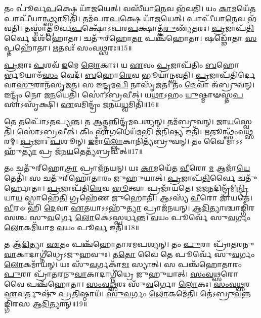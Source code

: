 𑌤𑌂 𑌪𑍂॑𑌰𑍍𑌵\-\ul{𑌪}\-𑌕𑍍𑌷𑍇 𑌯𑌾᳴𑌜𑌯𑍇𑌤𑍍।
𑌵𑌸𑍀᳴𑌯𑌾\-\ul{𑌨𑍇}\-𑌵 𑌭᳴𑌵𑌤𑌿।
𑌯𑌂 \ul{𑌕𑌾}\-𑌮𑌯𑍇᳴\-\ul{𑌤} 𑌪𑌾𑌪𑍀᳴𑌯𑌾\-\ul{𑌨𑍍𑌥𑍍𑌸𑍍𑌯𑌾}\-𑌦𑌿𑌤𑌿᳴।
𑌤𑌮᳴𑌪𑌰\-\ul{𑌪}\-𑌕𑍍𑌷𑍇 𑌯𑌾᳴𑌜𑌯𑍇𑌤𑍍।
𑌪𑌾𑌪𑍀᳴𑌯𑌾\-\ul{𑌨𑍇}\-𑌵 𑌭᳴𑌵𑌤𑌿।
𑌤𑌸𑍍𑌮𑌾॑𑌤𑍍𑌪𑍂𑌰𑍍𑌵\-\ul{𑌪}\-𑌕𑍍𑌷𑍋᳴\-𑌽𑌪𑌰\-\ul{𑌪}\-𑌕𑍍𑌷𑌾𑌤𑍍𑌕᳴\-\ul{𑌰𑍁}\-𑌣𑍍𑌯᳴𑌤𑌰𑌃।
\-\ul{𑌪𑍍𑌰}\-𑌜𑌾𑌪᳴\-\ul{𑌤𑌿}\-𑌰𑍍𑌵𑍈 𑌦𑌶᳴𑌹𑍋𑌤𑌾।
𑌚𑌤𑍁᳴𑌰𑍍‌\mbox{}𑌹𑍋\-\ul{𑌤𑌾} 𑌪𑌞𑍍𑌚᳴𑌹𑍋𑌤𑌾।
𑌷𑌡𑍍𑌢𑍋᳴𑌤𑌾 \ul{𑌸}\-𑌪𑍍𑌤𑌹𑍋᳴𑌤𑌾।
\-\ul{𑌋}\-𑌤𑌵𑌃᳴ 𑌸𑌂𑌵\-\ul{𑌥𑍍𑌸}\-𑌰𑌃॥15॥

\-\ul{𑌪𑍍𑌰}\-𑌜𑌾𑌃 \ul{𑌪}\-𑌶𑌵᳴ \ul{𑌇}\-𑌮𑍇 \ul{𑌲𑍋}\-𑌕𑌾𑌃।
𑌯 \ul{𑌏}\-𑌵𑌂 \ul{𑌪𑍍𑌰}\-𑌜𑌾𑌪᳴𑌤𑌿𑌂 \ul{𑌬}\-𑌹𑍋𑌰𑍍𑌭𑍂𑌯𑌾𑍞᳴\-\ul{𑌸𑌂} 𑌵𑍇𑌦᳴।
\-\ul{𑌬}\-𑌹𑍋\-\ul{𑌰𑍇}\-𑌵 𑌭𑍂𑌯𑌾॑𑌨𑍍𑌭𑌵𑌤𑌿।
\-\ul{𑌪𑍍𑌰}\-𑌜𑌾𑌪᳴𑌤𑌿𑌰𑍍𑌦𑍇𑌵𑌾\-\ul{𑌸𑍁}\-𑌰𑌾𑌨᳴\-𑌸𑍃𑌜𑌤।
𑌸 𑌇\-\ul{𑌨𑍍𑌦𑍍𑌰}\-𑌮\-\ul{𑌪𑌿} 𑌨𑌾𑌸𑍃᳴𑌜𑌤।
𑌤𑌂 \ul{𑌦𑍇}\-𑌵𑌾 𑌅᳴𑌬𑍍𑌰𑍁𑌵𑌨𑍍।
𑌇𑌨𑍍𑌦𑍍𑌰𑌂᳴ 𑌨𑍋 𑌜\-\ul{𑌨}\-𑌯𑍇𑌤𑌿᳴।
𑌸𑍋॑𑌽𑌬𑍍𑌰𑌵𑍀𑌤𑍍।
𑌯\-\ul{𑌥𑌾}\-𑌽𑌹𑌂 \ul{𑌯𑍁}\-𑌷𑍍𑌮𑌾𑍟𑌸𑍍𑌤\-\ul{𑌪}\-𑌸𑌾\-𑌽𑌸𑍃᳴𑌕𑍍𑌷𑌿।
\-\ul{𑌏}\-𑌵𑌮𑌿𑌨𑍍𑌦𑍍𑌰𑌂᳴ 𑌜𑌨𑌯\-\ul{𑌧𑍍𑌵}\-𑌮𑌿𑌤𑌿᳴॥16॥

𑌤𑍇 𑌤𑌪𑍋᳴\-𑌽𑌤𑌪𑍍𑌯𑌨𑍍𑌤।
𑌤 \ul{𑌆}\-𑌤𑍍𑌮𑌨𑍍𑌨𑌿𑌨𑍍𑌦𑍍𑌰᳴𑌮𑌪𑌶𑍍𑌯𑌨𑍍।
𑌤𑌮᳴𑌬𑍍𑌰𑍁𑌵𑌨𑍍।
𑌜𑌾\-\ul{𑌯}\-𑌸𑍍𑌵𑍇𑌤𑌿᳴।
𑌸𑍋॑𑌽𑌬𑍍𑌰𑌵𑍀𑌤𑍍।
𑌕𑌿𑌂 𑌭𑌾᳴\-\ul{𑌗}\-𑌧𑍇𑌯᳴\-\ul{𑌮}\-𑌭𑌿 𑌜᳴𑌨𑌿\-\ul{𑌷𑍍𑌯} 𑌇𑌤𑌿᳴।
\-\ul{𑌋}\-𑌤𑍂𑌨𑍍𑌥𑍍𑌸𑌂᳴𑌵\-\ul{𑌥𑍍𑌸}\-𑌰𑌮𑍍।
\-\ul{𑌪𑍍𑌰}\-𑌜𑌾𑌃 \ul{𑌪}\-𑌶𑍂𑌨𑍍।
\-\ul{𑌇}\-𑌮𑌾𑌁\-\ul{𑌲𑍍𑌲𑍋}\-𑌕𑌾𑌨𑌿𑌤𑍍𑌯᳴𑌬𑍍𑌰𑍁𑌵𑌨𑍍।
𑌤𑌂 𑌵𑍈 𑌮𑌾𑌽𑌽𑌹𑍁᳴\-\ul{𑌤𑍍𑌯𑌾} 𑌪𑍍𑌰 𑌜᳴𑌨\-\ul{𑌯}\-𑌤𑍇𑌤𑍍𑌯᳴𑌬𑍍𑌰𑌵𑍀𑌤𑍍॥17॥

𑌤𑌂 𑌚𑌤𑍁᳴𑌰𑍍‌\mbox{}𑌹𑍋\-\ul{𑌤𑍍𑌰𑌾} 𑌪𑍍𑌰𑌾𑌜᳴𑌨𑌯𑌨𑍍।
𑌯𑌃 \ul{𑌕𑌾}\-𑌮𑌯𑍇᳴𑌤 \ul{𑌵𑍀}\-𑌰𑍋 \ul{𑌮} 𑌆𑌜𑌾᳴\-\ul{𑌯𑍇}\-𑌤𑍇𑌤𑌿᳴।
𑌸 𑌚𑌤𑍁᳴𑌰𑍍‌\mbox{}𑌹𑍋𑌤𑌾𑌰𑌂 𑌜𑍁𑌹𑍁𑌯𑌾𑌤𑍍।
\-\ul{𑌪𑍍𑌰}\-𑌜𑌾𑌪᳴\-\ul{𑌤𑌿}\-𑌰𑍍𑌵𑍈 𑌚𑌤𑍁᳴𑌰𑍍\mbox{}𑌹𑍋𑌤𑌾।
\-\ul{𑌪𑍍𑌰}\-𑌜𑌾𑌪᳴𑌤𑌿\-\ul{𑌰𑍇}\-𑌵 \ul{𑌭𑍂}\-𑌤𑍍𑌵𑌾 𑌪𑍍𑌰𑌜𑌾᳴𑌯𑌤𑍇।
\-\ul{𑌜}\-𑌜\-\ul{𑌨}\-𑌦𑌿𑌨𑍍𑌦𑍍𑌰᳴𑌮𑌿\-\ul{𑌨𑍍𑌦𑍍𑌰𑌿}\-𑌯𑌾\-\ul{𑌯} 𑌸𑍍𑌵𑌾𑌹𑍇\-\ul{𑌤𑌿} 𑌗𑍍𑌰𑌹𑍇᳴𑌣 𑌜𑍁𑌹𑍋𑌤𑌿।
𑌆𑌽𑌸𑍍𑌯᳴ \ul{𑌵𑍀}\-𑌰𑍋 𑌜𑌾᳴𑌯𑌤𑍇।
\-\ul{𑌵𑍀}\-𑌰𑍞 𑌹𑌿 \ul{𑌦𑍇}\-𑌵𑌾 \ul{𑌏}\-𑌤𑌯𑌾\-𑌽𑌽𑌹𑍁᳴\-\ul{𑌤𑍍𑌯𑌾} 𑌪𑍍𑌰𑌾𑌜᳴𑌨𑌯𑌨𑍍।
\-\ul{𑌆}\-\-\ul{𑌦𑌿}\-𑌤𑍍𑌯𑌾𑌶𑍍𑌚𑌾𑌙𑍍𑌗𑌿᳴𑌰𑌸𑌶𑍍𑌚 𑌸𑍁\-\ul{𑌵}\-𑌰𑍍𑌗𑍇 \ul{𑌲𑍋}\-𑌕𑍇॑\-𑌽𑌸𑍍𑌪𑌰𑍍𑌧𑌨𑍍𑌤।
\-\ul{𑌵}\-𑌯𑌂 𑌪𑍂𑌰𑍍𑌵𑍇᳴ 𑌸𑍁\-\ul{𑌵}\-𑌰𑍍𑌗𑌂 \ul{𑌲𑍋}\-𑌕𑌮𑌿᳴𑌯𑌾𑌮 \ul{𑌵}\-𑌯𑌂 𑌪𑍂\-\ul{𑌰𑍍𑌵} 𑌇𑌤𑌿᳴॥18॥

𑌤 𑌆᳴\-\ul{𑌦𑌿}\-𑌤𑍍𑌯𑌾 \ul{𑌏}\-𑌤𑌂 𑌪𑌞𑍍𑌚᳴𑌹𑍋𑌤𑌾𑌰𑌮𑌪𑌶𑍍𑌯𑌨𑍍।
𑌤𑌂 \ul{𑌪𑍁}\-𑌰𑌾 𑌪𑍍𑌰𑌾᳴𑌤𑌰𑌨𑍁\-\-\ul{𑌵𑌾}\-𑌕𑌾𑌦𑌾𑌗𑍍𑌨𑍀॑𑌧𑍍𑌰𑍇\-𑌽𑌜𑍁𑌹𑌵𑍁𑌃।
𑌤\-\ul{𑌤𑍋} 𑌵𑍈 𑌤𑍇 𑌪𑍂𑌰𑍍𑌵𑍇᳴ 𑌸𑍁\-\ul{𑌵}\-𑌰𑍍𑌗𑌂 \ul{𑌲𑍋}\-𑌕𑌮𑌾᳴𑌯𑌨𑍍।
𑌯𑌃 𑌸𑍁᳴\-\ul{𑌵}\-𑌰𑍍𑌗𑌕𑌾᳴\-\ul{𑌮𑌃} 𑌸𑍍𑌯𑌾𑌤𑍍।
𑌸 𑌪𑌞𑍍𑌚᳴𑌹𑍋𑌤𑌾𑌰𑌂 \ul{𑌪𑍁}\-𑌰𑌾 𑌪𑍍𑌰𑌾᳴𑌤𑌰𑌨𑍁\-\-\ul{𑌵𑌾}\-𑌕𑌾\-𑌦𑌾𑌗𑍍𑌨𑍀॑𑌧𑍍𑌰𑍇 𑌜𑍁𑌹𑍁𑌯𑌾𑌤𑍍।
\-\ul{𑌸𑌂}\-\-\ul{𑌵}\-\-\ul{𑌥𑍍𑌸}\-𑌰𑍋 𑌵𑍈 𑌪𑌞𑍍𑌚᳴𑌹𑍋𑌤𑌾।
\-\ul{𑌸𑌂}\-\-\ul{𑌵}\-\-\ul{𑌥𑍍𑌸}\-𑌰𑌃 𑌸𑍁᳴\-\ul{𑌵}\-𑌰𑍍𑌗𑍋 \ul{𑌲𑍋}\-𑌕𑌃।
\-\ul{𑌸𑌂}\-\-\ul{𑌵}\-\-\ul{𑌥𑍍𑌸}\-𑌰 \ul{𑌏}\-𑌵𑌰𑍍𑌤𑍁𑌷𑍁᳴ 𑌪𑍍𑌰\-\ul{𑌤𑌿}\-𑌷𑍍𑌠𑌾𑌯᳴।
\-\ul{𑌸𑍁}\-\-\ul{𑌵}\-𑌰𑍍𑌗𑌂 \ul{𑌲𑍋}\-𑌕𑌮𑍇᳴𑌤𑌿।
𑌤𑍇॑𑌽𑌬𑍍𑌰𑍁\-\ul{𑌵}\-𑌨𑍍𑌨𑌙𑍍𑌗𑌿᳴𑌰𑌸 𑌆\-\ul{𑌦𑌿}\-𑌤𑍍𑌯𑌾𑌨𑍍॥19॥

